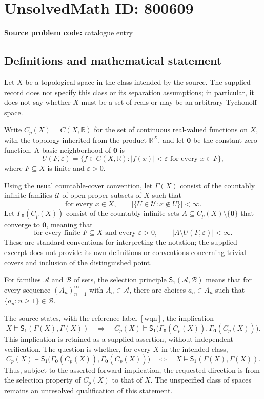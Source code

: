 \documentclass[11pt]{article}
\newcommand{\R}{\mathbb{R}}
\begin{document}
\section*{UnsolvedMath ID: 800609}
\textbf{Source problem code:} catalogue entry
\subsection{Definitions and mathematical statement}
Let \(X\) be a topological space in the class intended by the source. The supplied record does not specify this class or its separation assumptions; in particular, it does not say whether \(X\) must be a set of reals or may be an arbitrary Tychonoff space.

Write \(C_p(X)=C(X,\R)\) for the set of continuous real-valued functions on \(X\), with the topology inherited from the product \(\R^X\), and let \(\mathbf{0}\) be the constant zero function. A basic neighborhood of \(\mathbf{0}\) is
\[
U(F,\varepsilon)=\{f\in C(X,\R): |f(x)|<\varepsilon\text{ for every }x\in F\},
\]
where \(F\subseteq X\) is finite and \(\varepsilon>0\).

Using the usual countable-cover convention, let \(\Gamma(X)\) consist of the countably infinite families \(\mathcal U\) of open proper subsets of \(X\) such that
\[
\text{for every }x\in X,\qquad
\bigl|\{U\in\mathcal U:x\notin U\}\bigr|<\infty.
\]
Let \(\Gamma_{\mathbf{0}}(C_p(X))\) consist of the countably infinite sets \(A\subseteq C_p(X)\setminus\{\mathbf{0}\}\) that converge to \(\mathbf{0}\), meaning that
\[
\text{for every finite }F\subseteq X\text{ and every }\varepsilon>0,\qquad
|A\setminus U(F,\varepsilon)|<\infty.
\]
These are standard conventions for interpreting the notation; the supplied excerpt does not provide its own definitions or conventions concerning trivial covers and inclusion of the distinguished point.

For families \(\mathcal A\) and \(\mathcal B\) of sets, the selection principle \(\mathsf S_1(\mathcal A,\mathcal B)\) means that for every sequence \((A_n)_{n=1}^{\infty}\) with \(A_n\in\mathcal A\), there are choices \(a_n\in A_n\) such that \(\{a_n:n\geq1\}\in\mathcal B\).

The source states, with the reference label \([\mathrm{wqn}]\), the implication
\[
X\models\mathsf S_1(\Gamma(X),\Gamma(X))
\quad\Longrightarrow\quad
C_p(X)\models\mathsf S_1\bigl(\Gamma_{\mathbf{0}}(C_p(X)),\Gamma_{\mathbf{0}}(C_p(X))\bigr).
\]
This implication is retained as a supplied assertion, without independent verification. The question is whether, for every \(X\) in the intended class,
\[
C_p(X)\models\mathsf S_1\bigl(\Gamma_{\mathbf{0}}(C_p(X)),\Gamma_{\mathbf{0}}(C_p(X))\bigr)
\quad\Longleftrightarrow\quad
X\models\mathsf S_1(\Gamma(X),\Gamma(X)).
\]
Thus, subject to the asserted forward implication, the requested direction is from the selection property of \(C_p(X)\) to that of \(X\). The unspecified class of spaces remains an unresolved qualification of this statement.
\end{document}
